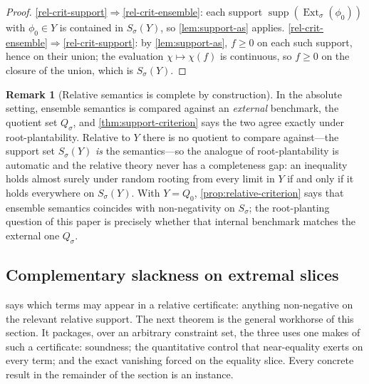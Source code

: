 \documentclass[11pt]{article}
\theoremstyle{definition}
\newtheorem{remark}[remark]{Remark}
\newcommand{\Ext}{\operatorname{Ext}}
\newcommand{\supp}{\operatorname{supp}}
\begin{document}
\begin{proof}
\ref{rel-crit-support}$\Rightarrow$\ref{rel-crit-ensemble}: each support
$\supp(\Ext_\sigma(\phi_0))$ with $\phi_0\in Y$ is contained in $S_\sigma(Y)$, so
\cref{lem:support-as} applies.
\ref{rel-crit-ensemble}$\Rightarrow$\ref{rel-crit-support}: by \cref{lem:support-as},
$f\ge0$ on each such support, hence on their union; the evaluation
$\chi\mapsto\chi(f)$ is continuous, so $f\ge0$ on the closure of the union, which is
$S_\sigma(Y)$.
\end{proof}

\begin{remark}[Relative semantics is complete by construction]
In the absolute setting, ensemble semantics is compared against an \emph{external}
benchmark, the quotient set $Q_\sigma$, and \cref{thm:support-criterion} says the two
agree exactly under root-plantability.  Relative to $Y$ there is no quotient to compare
against---the support set $S_\sigma(Y)$ \emph{is} the semantics---so the analogue of
root-plantability is automatic and the relative theory never has a completeness gap: an
inequality holds almost surely under random rooting from every limit in $Y$ if and only
if it holds everywhere on $S_\sigma(Y)$.  With $Y=Q_0$,
\cref{prop:relative-criterion} says that ensemble semantics coincides with
non-negativity on $S_\sigma$; the root-planting question of this paper is precisely
whether that internal benchmark matches the external one $Q_\sigma$.
\end{remark}

\subsection{Complementary slackness on extremal slices}

 says which terms may appear in a relative certificate:
anything non-negative on the relevant relative support.  The next theorem is the general
workhorse of this section.  It packages, over an arbitrary constraint set, the three uses
one makes of such a certificate: soundness; the quantitative control that near-equality
exerts on every term; and the exact vanishing forced on the equality slice.  Every
concrete result in the remainder of the section is an instance.
\end{document}
